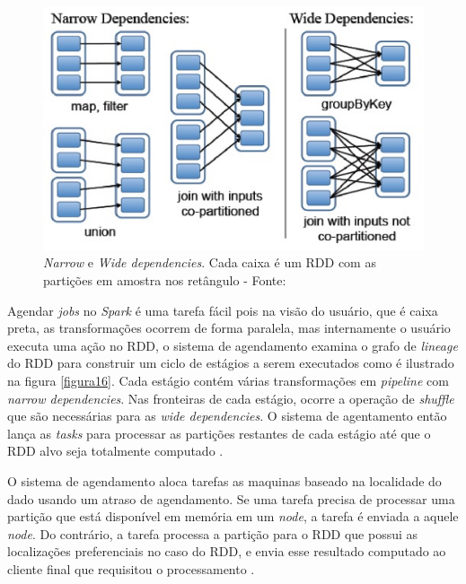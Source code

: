              \begin{figure}[ht!]
                        \centering
                        \includegraphics[keepaspectratio=true,scale=0.7]
                            {figuras/figura15.eps}
                        \caption[\textit{Narrow} e \textit{Wide dependencies}. Cada caixa é um RDD com as partições em amostra nos retângulo]
                        {\textit{Narrow} e \textit{Wide dependencies}. Cada caixa é um RDD com as partições em amostra nos retângulo -
                        \protect  Fonte: }
                        \label{figura15}
            \end{figure}

            Agendar \textit{jobs} no \textit{Spark} é uma tarefa fácil pois na visão do usuário, que é caixa preta, as transformações
            ocorrem de forma paralela, mas internamente o usuário executa uma ação no RDD, o sistema de agendamento examina
            o grafo de \textit{lineage} do RDD para construir um ciclo de estágios a serem executados como é ilustrado na figura
            \ref{figura16}.  Cada estágio contém várias transformações em \textit{pipeline} com \textit{narrow dependencies}. Nas
            fronteiras de cada estágio, ocorre a operação de \textit{shuffle} que são necessárias para as \textit{wide dependencies}.
            O sistema de agentamento então lança as \textit{tasks} para processar as partições restantes de cada estágio até que o
            RDD alvo seja totalmente computado \cite{karau2015}.

            O sistema de agendamento aloca tarefas as maquinas baseado na localidade do dado usando um atraso de agendamento.
            Se uma tarefa precisa de processar uma partição que está disponível em memória em um \textit{node}, a tarefa é enviada
            a aquele \textit{node}. Do contrário, a tarefa processa a partição para o RDD que possui as localizações preferenciais no
            caso do RDD, e envia esse resultado computado ao cliente final que requisitou o processamento \cite{zaharia2013}.

